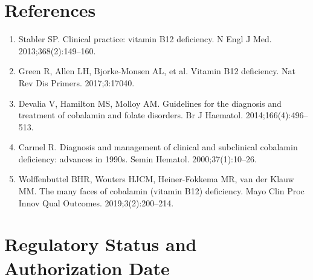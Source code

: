 \section*{References}
\begin{enumerate}
  \item Stabler SP. Clinical practice: vitamin B12 deficiency. N Engl J Med. 2013;368(2):149--160.
  \item Green R, Allen LH, Bjorke-Monsen AL, et al. Vitamin B12 deficiency. Nat Rev Dis Primers. 2017;3:17040.
  \item Devalia V, Hamilton MS, Molloy AM. Guidelines for the diagnosis and treatment of cobalamin and folate disorders. Br J Haematol. 2014;166(4):496--513.
  \item Carmel R. Diagnosis and management of clinical and subclinical cobalamin deficiency: advances in 1990s. Semin Hematol. 2000;37(1):10--26.
  \item Wolffenbuttel BHR, Wouters HJCM, Heiner-Fokkema MR, van der Klauw MM. The many faces of cobalamin (vitamin B12) deficiency. Mayo Clin Proc Innov Qual Outcomes. 2019;3(2):200--214.
\end{enumerate}

\clearpage
\section*{Regulatory Status and Authorization Date}

\clearpage
